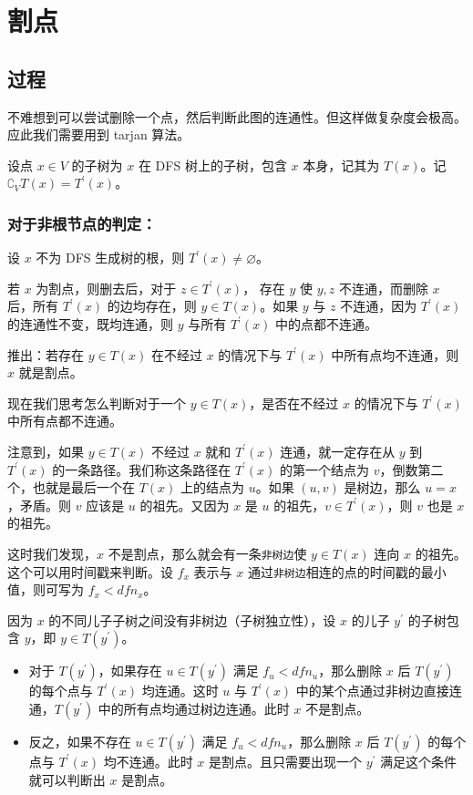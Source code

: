 \documentclass[10pt,twoside,a4paper,UTF8]{ctexbook}
\begin{document}
	
	\section{割点}
	\subsection{过程}
	不难想到可以尝试删除一个点，然后判断此图的连通性。但这样做复杂度会极高。应此我们需要用到 tarjan 算法。\par
	设点 $x\in V$ 的子树为 $x$ 在 DFS 树上的子树，包含 $x$ 本身，记其为 $T(x)$。记 $\complement_{V}T(x) = T^{\prime}(x)$。
	\subsubsection{对于非根节点的判定：}
	设 $x$ 不为 DFS 生成树的根，则 $T^{\prime}(x) \not= \varnothing$。\par
	若 $x$ 为割点，则删去后，对于 $z \in T^\prime(x)$， 存在 $y$ 使 $y,z$ 不连通，而删除 $x$ 后，所有 $T^\prime(x)$ 的边均存在，则 $y\in T(x)$。如果 $y$ 与 $z$ 不连通，因为 $T^\prime(x)$ 的连通性不变，既均连通，则 $y$ 与所有 $T^\prime(x)$ 中的点都不连通。\par
	推出：若存在 $ y \in T(x)$ 在不经过 $x$ 的情况下与 $T^\prime(x)$ 中所有点均不连通，则 $x$ 就是割点。\par
	现在我们思考怎么判断对于一个 $y \in T(x)$，是否在不经过 $x$ 的情况下与 $T^\prime(x)$ 中所有点都不连通。\par
	注意到，如果 $y\in T(x)$ 不经过 $x$ 就和 $T^\prime(x)$ 连通，就一定存在从 $y$ 到 $T^\prime(x)$ 的一条路径。我们称这条路径在 $T^\prime(x)$ 的第一个结点为 $v$，倒数第二个，也就是最后一个在 $T(x)$ 上的结点为 $u$。如果 $(u,v)$ 是树边，那么 $u=x$，矛盾。则 $v$ 应该是 $u$ 的祖先。又因为 $x$ 是 $u$ 的祖先，$v\in T^\prime(x)$，则 $v$ 也是 $x$ 的祖先。\par 
	这时我们发现，$x$ 不是割点，那么就会有一条\texttt{非树边}使 $y\in T(x)$ 连向 $x$ 的祖先。这个可以用时间戳来判断。设 $f_x$ 表示与 $x$ 通过\texttt{非树边}相连的点的时间戳的最小值，则可写为 $f_x < dfn_x$。\par
	因为 $x$ 的不同儿子子树之间没有非树边（子树独立性），设 $x$ 的儿子 $y^\prime$ 的子树包含 $y$，即 $y\in T(y^\prime)$。\par
	\begin{itemize}
		\item 对于 $T(y^\prime)$，如果存在 $u\in T(y^\prime)$ 满足 $f_u < dfn_u$，那么删除 $x$ 后 $T(y^\prime)$ 的每个点与 $T^\prime(x)$ 均连通。这时 $u$ 与 $T^\prime(x)$ 中的某个点通过非树边直接连通，$T(y^\prime)$ 中的所有点均通过树边连通。此时 $x$ 不是割点。\par
		\item 反之，如果不存在 $u\in T(y^\prime)$ 满足 $f_u < dfn_u$，那么删除 $x$ 后 $T(y^\prime)$ 的每个点与 $T^\prime(x)$ 均不连通。此时 $x$ 是割点。且只需要出现一个 $y^\prime$ 满足这个条件就可以判断出 $x$ 是割点。
	\end{itemize}\par
\end{document}
